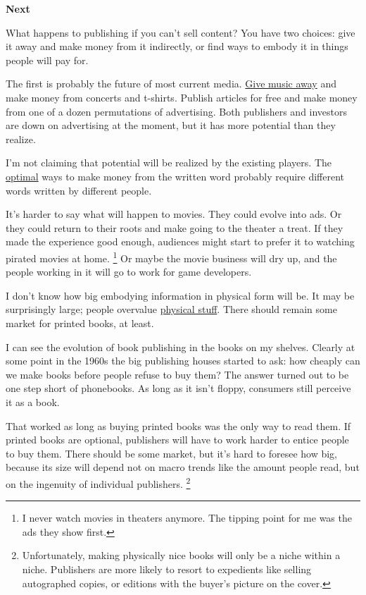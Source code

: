\textbf{Next}

What happens to publishing if you can't sell content? You have two
choices: give it away and make money from it indirectly, or find ways to
embody it in things people will pay for.

The first is probably the future of most current media.
\href{http://thesixtyone.com}{Give music away} and make money from
concerts and t-shirts. Publish articles for free and make money from one
of a dozen permutations of advertising. Both publishers and investors
are down on advertising at the moment, but it has more potential than
they realize.

I'm not claiming that potential will be realized by the existing
players. The \href{http://ycombinator.com/rfs1.html}{optimal} ways to
make money from the written word probably require different words
written by different people.

It's harder to say what will happen to movies. They could evolve into
ads. Or they could return to their roots and make going to the theater a
treat. If they made the experience good enough, audiences might start to
prefer it to watching pirated movies at home. \footnote{I never watch movies in theaters anymore. The tipping point for
me was the ads they show first.} Or
maybe the movie business will dry up, and the people working in it will
go to work for game developers.

I don't know how big embodying information in physical form will be. It
may be surprisingly large; people overvalue \href{stuff.html}{physical
stuff}. There should remain some market for printed books, at least.

I can see the evolution of book publishing in the books on my shelves.
Clearly at some point in the 1960s the big publishing houses started to
ask: how cheaply can we make books before people refuse to buy them? The
answer turned out to be one step short of phonebooks. As long as it
isn't floppy, consumers still perceive it as a book.

That worked as long as buying printed books was the only way to read
them. If printed books are optional, publishers will have to work harder
to entice people to buy them. There should be some market, but it's hard
to foresee how big, because its size will depend not on macro trends
like the amount people read, but on the ingenuity of individual
publishers. \footnote{Unfortunately, making physically nice books will only be a niche
within a niche. Publishers are more likely to resort to expedients like
selling autographed copies, or editions with the buyer's picture on the
cover.}

